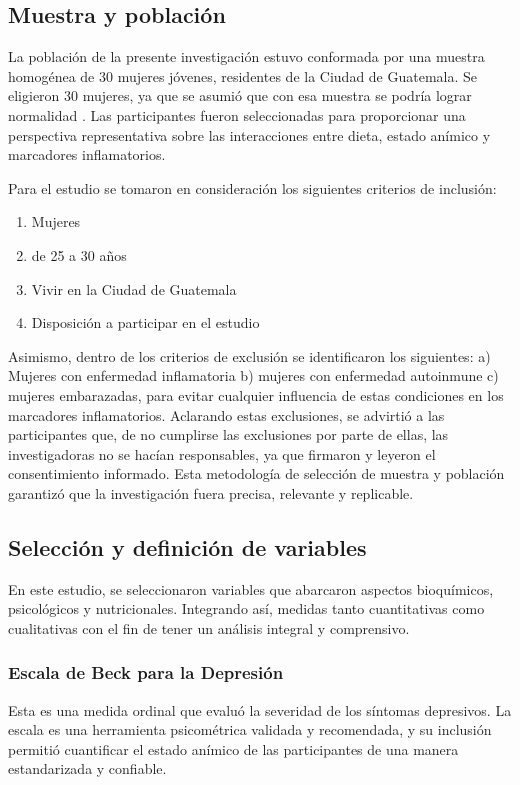\documentclass[man]{apa7}
\begin{document}
	\subsection{Muestra y población}\label{muestra-y-poblaciuxf3n}

	La población de la presente investigación estuvo conformada por una
	muestra homogénea de 30 mujeres jóvenes, residentes de la Ciudad de
	Guatemala. Se eligieron 30 mujeres, ya que se asumió que con esa muestra
	se podría lograr normalidad \parencite{Hernandez2018}. Las
	participantes fueron seleccionadas para proporcionar una perspectiva
	representativa sobre las interacciones entre dieta, estado anímico y
	marcadores inflamatorios.

	Para el estudio se tomaron en consideración los siguientes criterios de
	inclusión:
	\begin{enumerate}
		\item Mujeres
		\item de 25 a 30 años
		\item Vivir en la Ciudad de Guatemala
		\item Disposición a participar en el estudio
	\end{enumerate}


	Asimismo, dentro de los criterios de exclusión se identificaron los
	siguientes: a) Mujeres con enfermedad inflamatoria b) mujeres con
	enfermedad autoinmune c) mujeres embarazadas, para evitar cualquier
	influencia de estas condiciones en los marcadores inflamatorios.
	Aclarando estas exclusiones, se advirtió a las participantes que, de no
	cumplirse las exclusiones por parte de ellas, las investigadoras no se
	hacían responsables, ya que firmaron y leyeron el consentimiento
	informado. Esta metodología de selección de muestra y población
	garantizó que la investigación fuera precisa, relevante y replicable.

	\subsection{Selección y definición de variables}\label{selecciuxf3n-y-definiciuxf3n-de-variables}

	En este estudio, se seleccionaron variables que abarcaron aspectos
	bioquímicos, psicológicos y nutricionales. Integrando así, medidas tanto
	cuantitativas como cualitativas con el fin de tener un análisis integral
	y comprensivo.\\

	\subsubsection{Escala de Beck para la Depresión}
	Esta es una medida ordinal que evaluó la severidad de los síntomas depresivos. La escala es una herramienta psicométrica validada y recomendada, y su inclusión permitió cuantificar el estado anímico de las participantes de una manera estandarizada y confiable.
\end{document}
